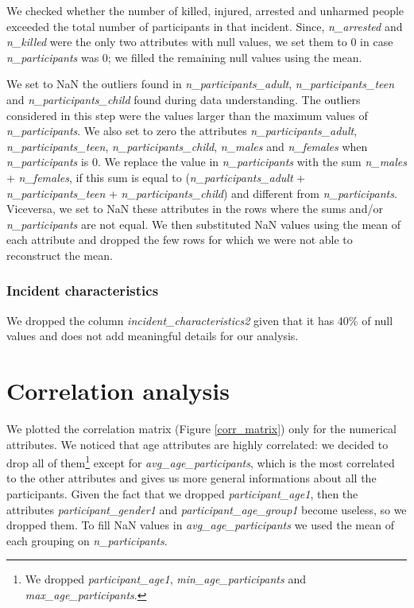 \documentclass[11pt,a4paper]{report}
\begin{document}
We checked whether the number of killed, injured, arrested and unharmed people exceeded the total number of participants in that incident.
Since, \textit{n\_arrested} and \textit{n\_killed} were the only two attributes with null values, we set them to 0 in case \textit{n\_participants} was 0; we filled the remaining null values using the mean.

We set to NaN the outliers found in \textit{n\_participants\_adult}, \textit{n\_participants\_teen} and \textit{n\_participants\_child} found during data understanding.
The outliers considered in this step were the values larger than the maximum values of \textit{n\_participants}.
We also set to zero the attributes \textit{n\_participants\_adult}, \textit{n\_participants\_teen}, \textit{n\_participants\_child}, \textit{n\_males} and \textit{n\_females} when \textit{n\_participants} is 0.
We replace the value in \textit{n\_participants} with the sum \textit{n\_males} + \textit{n\_females}, if this sum is equal to (\textit{n\_participants\_adult} + \textit{n\_participants\_teen} + \textit{n\_participants\_child}) and different from \textit{n\_participants}.
Viceversa, we set to NaN these attributes in the rows where the sums and/or \textit{n\_participants} are not equal.
We then substituted NaN values using the mean of each attribute and dropped the few rows for which we were not able to reconstruct the mean.

\subsubsection{Incident characteristics}

We dropped the column \textit{incident\_characteristics2} given that it has 40\% of null values and does not add meaningful details for our analysis.

\section{Correlation analysis}

We plotted the correlation matrix (Figure \ref{corr_matrix}) only for the numerical attributes.
We noticed that age attributes are highly correlated: we decided to drop all of them\footnote{We dropped \textit{participant\_age1}, \textit{min\_age\_participants} and \textit{max\_age\_participants}.} except for \textit{avg\_age\_participants}, which is the most correlated to the other attributes and gives us more general informations about all the participants.
Given the fact that we dropped \textit{participant\_age1}, then the attributes \textit{participant\_gender1} and \textit{participant\_age\_group1} become useless, so we dropped them.
To fill NaN values in \textit{avg\_age\_participants} we used the mean of each grouping on \textit{n\_participants}.
\end{document}
